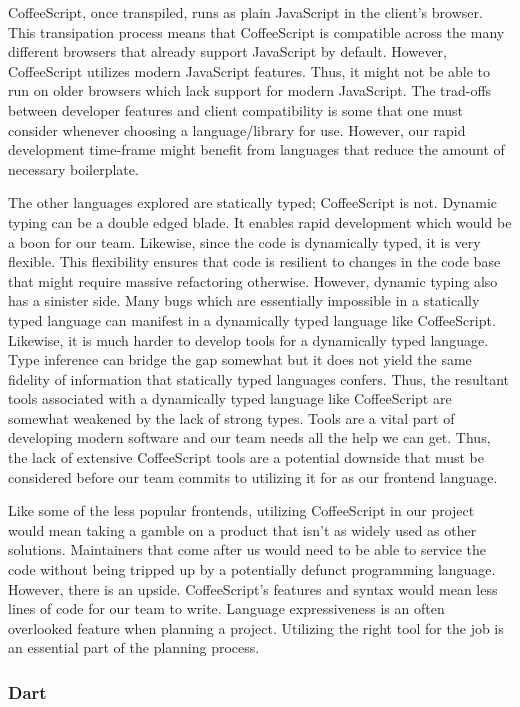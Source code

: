 \documentclass[12pt]{report}
\begin{document}
CoffeeScript, once transpiled, runs as plain JavaScript in the client's browser.\cite{coffeescriptguide} This transipation process means that CoffeeScript is compatible across the many different browsers that already support JavaScript by default. However, CoffeeScript utilizes modern JavaScript features.\cite{coffeescriptguide} Thus, it might not be able to run on older browsers which lack support for modern JavaScript. The trad-offs between developer features and client compatibility is some that one must consider whenever choosing a language/library for use. However, our rapid development time-frame might benefit from languages that reduce the amount of necessary boilerplate.

The other languages explored are statically typed; CoffeeScript is not. Dynamic typing can be a double edged blade. It enables rapid development which would be a boon for our team. Likewise, since the code is dynamically typed, it is very flexible. This flexibility ensures that code is resilient to changes in the code base that might require massive refactoring otherwise. However, dynamic typing also has a sinister side. Many bugs which are essentially impossible in a statically typed language can manifest in a dynamically typed language like CoffeeScript. Likewise, it is much harder to develop tools for a dynamically typed language. Type inference can bridge the gap somewhat but it does not yield the same fidelity of information that statically typed languages confers. Thus, the resultant tools associated with a dynamically typed language like CoffeeScript are somewhat weakened by the lack of strong types. Tools are a vital part of developing modern software and our team needs all the help we can get. Thus, the lack of extensive CoffeeScript tools are a potential downside that must be considered before our team commits to utilizing it for as our frontend language.

Like some of the less popular frontends, utilizing CoffeeScript in our project would mean taking a gamble on a product that isn't as widely used as other solutions. Maintainers that come after us would need to be able to service the code without being tripped up by a potentially defunct programming language. However, there is an upside. CoffeeScript's features and syntax would mean less lines of code for our team to write. Language expressiveness is an often overlooked feature when planning a project. Utilizing the right tool for the job is an essential part of the planning process.

\subsubsection*{Dart}
\end{document}
